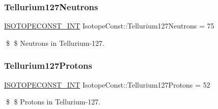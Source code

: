 \subsubsection{\texorpdfstring{Tellurium127\+Neutrons}{Tellurium127Neutrons}}
{\footnotesize\ttfamily \mbox{\hyperlink{group___isotope_const-_macros_ga5f18360b3e99483a35c32d789e62621c}{I\+S\+O\+T\+O\+P\+E\+C\+O\+N\+S\+T\+\_\+\+I\+NT}} Isotope\+Const\+::\+Tellurium127\+Neutrons = 75}

\$ \$ Neutrons in Tellurium-\/127. \mbox{\label{group___isotope_const-_tellurium-_te127_ga6fff56b88fc5abd88d76881acbf0611c}} 
\subsubsection{\texorpdfstring{Tellurium127\+Protons}{Tellurium127Protons}}
{\footnotesize\ttfamily \mbox{\hyperlink{group___isotope_const-_macros_ga5f18360b3e99483a35c32d789e62621c}{I\+S\+O\+T\+O\+P\+E\+C\+O\+N\+S\+T\+\_\+\+I\+NT}} Isotope\+Const\+::\+Tellurium127\+Protons = 52}

\$ \$ Protons in Tellurium-\/127. 